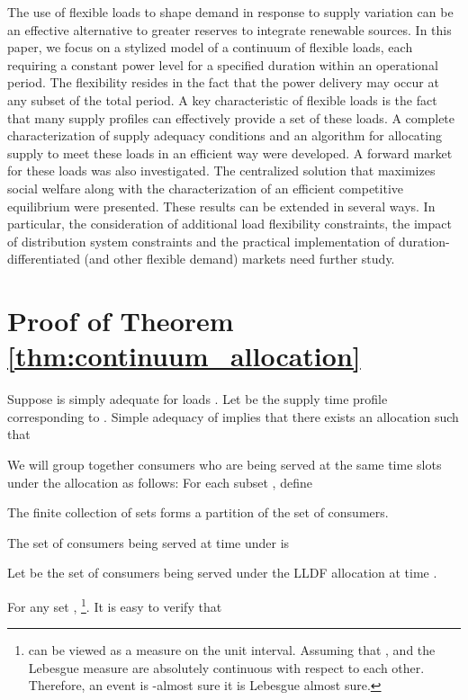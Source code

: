 \documentclass[10pt,draftcls,onecolumn]{IEEEtran}
\newcounter{l1}
\newcounter{l2}
\newcounter{l3}
\begin{document}
The use of flexible loads to shape demand in response to supply variation can be an effective alternative to greater reserves to integrate renewable sources. In this paper, we focus on a stylized model of a continuum of flexible loads, each requiring a constant power level for a specified duration within an operational period. The flexibility resides in the fact that the power delivery may occur at any subset of the total period. 
A key characteristic of flexible loads is the fact that many supply profiles can effectively provide a set of these loads. A complete characterization of supply adequacy conditions and an algorithm for allocating supply to meet these loads in an efficient way were developed. 
A forward market for these loads was also investigated. The centralized solution that maximizes social welfare along with the characterization of an efficient competitive equilibrium were presented. These results can be extended in several ways. In particular, the consideration of additional load flexibility constraints, the impact of distribution system constraints and the practical implementation of duration-differentiated (and other flexible demand) markets need further study.












\appendix
\section{Proof of Theorem \ref{thm:continuum_allocation}} \label{sec:allocation_proof}

Suppose  is simply adequate for  loads .
Let  be the supply time profile corresponding to  . Simple adequacy of  implies that there exists an allocation  such that 


We will group together consumers who are being served at the same time slots under the allocation  as follows: For each  subset , define

The finite collection of sets  forms a partition of the set of consumers.

The set of consumers being served at time  under  is


Let  be the set of consumers being served under the LLDF allocation at time .

For any  set ,  \footnote{ can be viewed as a measure on the unit interval. Assuming that ,  and the Lebesgue measure are absolutely continuous with respect to each other. Therefore,  an event is -almost sure  it is Lebesgue almost sure.}. It is easy to verify that 
\end{document}

